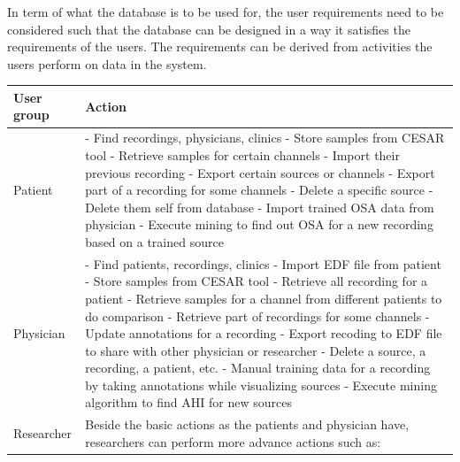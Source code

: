 In term of what the database is to be used for, the user requirements need to be considered such that the database can be designed in a way it satisfies the requirements of the users. The requirements can be derived from activities the users perform on data in the system. 
\begin{table}[ht]
\begin{center}
\begin{tabular}{ |p{3cm}||p{10cm}|}
 \hline
 User group& Action\\
 \hline
 Patient&- Find recordings, physicians, clinics\newline
 - Store samples from CESAR tool\newline
 - Retrieve samples for certain channels\newline
 - Import their previous recording\newline
 - Export certain sources or channels\newline
 - Export part of a recording for some channels\newline
 - Delete a specific source\newline
 - Delete them self from database\newline
 - Import trained OSA data from physician\newline
 - Execute mining to find out OSA for a new recording based on a trained source\\
 \hline
 Physician&- Find patients, recordings, clinics\newline
 - Import EDF file from patient\newline
 - Store samples from CESAR tool\newline
 - Retrieve all recording for a patient\newline
 - Retrieve samples for a channel from different patients to do comparison\newline
 - Retrieve part of recordings for some channels\newline
 - Update annotations for a recording\newline
 - Export recoding to EDF file to share with other physician or researcher\newline
 - Delete a source, a recording, a patient, etc.\newline
 - Manual training data for a recording by taking annotations while visualizing sources\newline
 - Execute mining algorithm to find AHI for new sources\\
 \hline
 Researcher&Beside the basic actions as the patients and physician have, researchers can perform more advance actions such as:\newline

\end{tabular}
\end{center}
\end{table}
